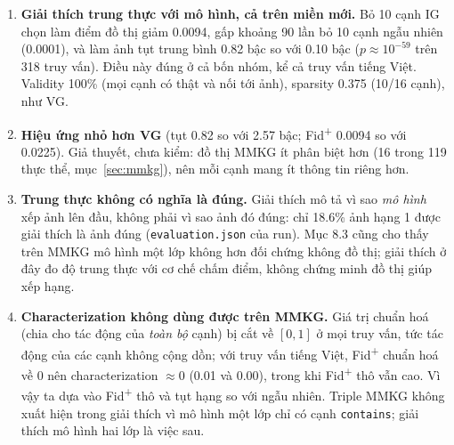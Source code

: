 \documentclass[12pt, a4paper]{article}
\newcommand{\code}[1]{\texttt{#1}}
\begin{document}
\begin{enumerate}[leftmargin=*]
\item \textbf{Giải thích trung thực với mô hình, cả trên miền mới.} Bỏ 10 cạnh IG chọn làm điểm đồ thị giảm 0.0094, gấp khoảng 90 lần bỏ 10 cạnh ngẫu nhiên (0.0001), và làm ảnh tụt trung bình 0.82 bậc so với 0.10 bậc ($p \approx 10^{-59}$ trên 318 truy vấn). Điều này đúng ở cả bốn nhóm, kể cả truy vấn tiếng Việt. Validity 100\% (mọi cạnh có thật và nối tới ảnh), sparsity 0.375 (10/16 cạnh), như VG.
\item \textbf{Hiệu ứng nhỏ hơn VG} (tụt 0.82 so với 2.57 bậc; Fid\textsuperscript{+} 0.0094 so với 0.0225). Giả thuyết, chưa kiểm: đồ thị MMKG ít phân biệt hơn (16 trong 119 thực thể, mục~\ref{sec:mmkg}), nên mỗi cạnh mang ít thông tin riêng hơn.
\item \textbf{Trung thực không có nghĩa là đúng.} Giải thích mô tả vì sao \emph{mô hình} xếp ảnh lên đầu, không phải vì sao ảnh đó đúng: chỉ 18.6\% ảnh hạng 1 được giải thích là ảnh đúng (\code{evaluation.json} của run). Mục 8.3 cũng cho thấy trên MMKG mô hình một lớp không hơn đối chứng không đồ thị; giải thích ở đây đo độ trung thực với cơ chế chấm điểm, không chứng minh đồ thị giúp xếp hạng.
\item \textbf{Characterization không dùng được trên MMKG.} Giá trị chuẩn hoá (chia cho tác động của \emph{toàn bộ} cạnh) bị cắt về $[0,1]$ ở mọi truy vấn, tức tác động của các cạnh không cộng dồn; với truy vấn tiếng Việt, Fid\textsuperscript{+} chuẩn hoá về 0 nên characterization $\approx 0$ (0.01 và 0.00), trong khi Fid\textsuperscript{+} thô vẫn cao. Vì vậy ta dựa vào Fid\textsuperscript{+} thô và tụt hạng so với ngẫu nhiên. Triple MMKG không xuất hiện trong giải thích vì mô hình một lớp chỉ có cạnh \code{contains}; giải thích mô hình hai lớp là việc sau.
\end{enumerate}

\end{document}
